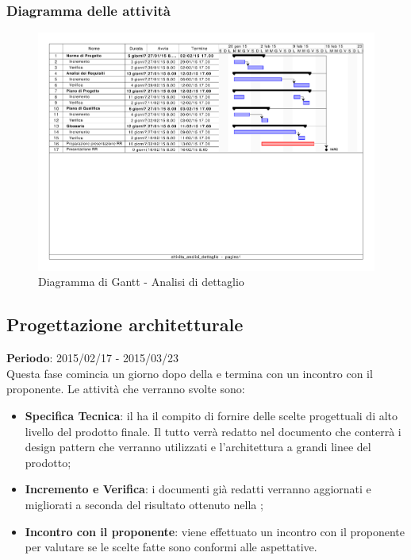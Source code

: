 		\subsubsection{Diagramma delle attività} %
		\label{ssub:diagramma_delle_attivita}
			\begin{figure}[htbp]
				\centering
				\centerline{\includegraphics[scale=0.7]{images/d_attivita_analisi_dettaglio.pdf}}
				\caption{Diagramma di Gantt - Analisi di dettaglio}
				\label{fig:gantt_analisi_dettaglio}				
			\end{figure}
	
	\subsection{Progettazione architetturale} %
	\label{sub:progettazione_architetturale}
	\textbf{Periodo}:  2015/02/17 - 2015/03/23 \\
	Questa fase comincia un giorno dopo della \RR{} e termina con un incontro con il proponente.
	Le attività che verranno svolte sono:
		\begin{itemize}
			\item \textbf{Specifica Tecnica}: il \roleDesigner{} ha il compito di fornire delle scelte progettuali di alto livello del prodotto finale. Il tutto verrà redatto nel documento \docNameVersionST{} che conterrà i design pattern che verranno utilizzati e l'architettura a grandi linee del prodotto;
			\item \textbf{Incremento e Verifica}: i documenti già redatti verranno aggiornati e migliorati a seconda del risultato ottenuto nella \RR;
			\item \textbf{Incontro con il proponente}: viene effettuato un incontro con il proponente per valutare se le scelte fatte sono conformi alle aspettative.
		\end{itemize}
		
